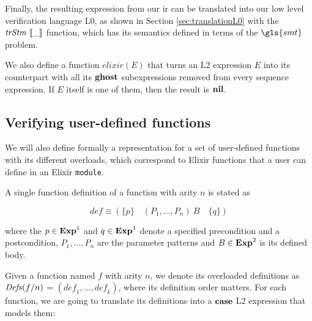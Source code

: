 Finally, the resulting expression from our \gls{ir} can be translated into our
low level verification language L0, as shown in Section \ref{sec:translationL0}
with the $\mathit{trStm}~\llbracket\_\rrbracket$ function, which has its semantics defined in terms of the
$\gls{smt}$ problem.

We also define a function $\mathit{elixir}(E)$ that turns an L2 expression $E$
into its counterpart with all its $\textbf{ghost}$ subexpressions removed from every 
sequence expression. If $E$ itself is one of them, then the result is $\textbf{nil}$. 

\subsection{Verifying user-defined functions}

We will also define formally a representation for a set of user-defined
functions with its different overloads, which correspond to Elixir functions
that a user can define in an Elixir \verb|module|.

A single function definition of a function with arity $n$ is stated as

\[
\mathit{def} \equiv \left(\{ p \}  \quad (P_1, \dots, P_n)~B \quad \{ q \} \right)
\]

where the $p \in \mathbf{Exp}^{1}$ and $q \in \mathbf{Exp}^{1}$ denote a specified precondition
and a postcondition, $P_1, \dots, P_n$ are the parameter patterns and $B \in
\mathbf{Exp}^{2}$ is its defined body.

Given a function named $f$ with arity $n$, we denote its overloaded definitions
as $\mathit{Defs}(f/n)$ = $(\mathit{def}_1,\dots,\mathit{def}_k)$, where its definition
order matters. For each function, we are going to translate its definitions into
a $\textbf{case}$ L2 expression that models them:


